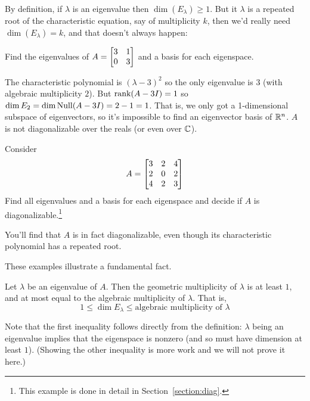 By definition, if $\lambda$ is an eigenvalue then $\dim(E_\lambda) \geq 1$.
But it $\lambda$ is a repeated root of the characteristic equation,
say of multiplicity $k$, then we'd really need $\dim(E_\lambda) = k$,
and that doesn't always happen:

\begin{myprob} Find the eigenvalues of $A = \left[ \begin{matrix} 3 & 1\\ 0 & 3 \end{matrix} \right]$ and a
basis for each eigenspace.

\begin{mysol} The characteristic polynomial is $(\lambda -3)^2$ so
the only eigenvalue is $3$ (with algebraic multiplicity $2$).
But  $\textrm{rank}(A- 3I) = 1$ so $\dim E_2 = \dim \operatorname{Null}(A- 3I) = 2-1=1$.
That is, we only got a 1-dimensional subspace of eigenvectors,
so it's impossible to find an eigenvector basis of $\mathbb{R}^n$.
$A$ is not diagonalizable over the reals (or even over $\mathbb{C}$). %
\end{mysol}\end{myprob}


\begin{myexample} Consider 
$$
A = \left[ \begin{matrix} 3 & 2 & 4\\ 2& 0 & 2\\ 4 & 2 & 3 \end{matrix} \right]
$$
Find all eigenvalues and a basis for each eigenspace and decide
if $A$ is diagonalizable.\footnote{This example is done in detail in Section~\ref{section:diag}.  }

You'll find that $A$ is in fact diagonalizable, even though
its characteristic polynomial has a repeated root.  
\end{myexample}


These examples illustrate a fundamental fact.

\begin{theorem}\label{thm:limitsmult}
Let $\lambda$ be an eigenvalue of $A$.  Then 
the geometric multiplicity of $\lambda$ is at least $1$, and
at most equal to the algebraic multiplicity of $\lambda$.  That
is,
$$
1 \leq \dim E_\lambda \leq \textrm{algebraic multiplicity of $\lambda$}
$$
\end{theorem}

Note that the first inequality  follows directly from the definition:  $\lambda$
being an eigenvalue implies that the eigenspace is nonzero (and so
must have dimension at least $1$).  (Showing the other inequality is
more work and we will not prove it here.)

